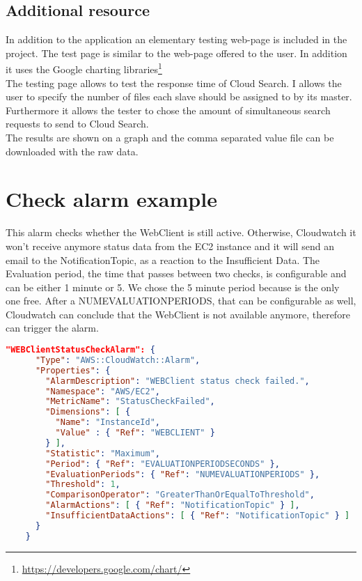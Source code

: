 \documentclass{acm_proc_article-sp}
\begin{document}
\subsection{Additional resource}
In addition to the application an elementary testing web-page is included in the project.
The test page is similar to the web-page offered to the user.
In addition it uses the Google charting libraries\footnote{\url{https://developers.google.com/chart/}}\\
The testing page allows to test the response time of Cloud Search.
I allows the user to specify the number of files each slave should be assigned to by its master.
Furthermore it allows the tester to chose the amount of simultaneous search requests to send to Cloud Search.\\
The results are shown on a graph and the comma separated value file can be downloaded with the raw data.

\section{Check alarm example}
\label{app:exCA}
This alarm checks whether the WebClient is still active. 
Otherwise, Cloudwatch it won't receive anymore status data from the EC2 instance and it will send an email to the NotificationTopic, as a reaction to the Insufficient Data. 
The Evaluation period, the time that passes between two checks, is configurable and can be either 1 minute or 5. 
We chose the 5 minute period because is the only one free. 
After a NUMEVALUATIONPERIODS, that can be configurable as well, Cloudwatch can conclude that the WebClient is not available anymore, therefore can trigger the alarm.

\begin{lstlisting}[language=json,firstnumber=1]
"WEBClientStatusCheckAlarm": {
      "Type": "AWS::CloudWatch::Alarm",
      "Properties": {
        "AlarmDescription": "WEBClient status check failed.",
        "Namespace": "AWS/EC2",
        "MetricName": "StatusCheckFailed",
        "Dimensions": [ {
          "Name": "InstanceId",
          "Value" : { "Ref": "WEBCLIENT" }
        } ],
        "Statistic": "Maximum",
        "Period": { "Ref": "EVALUATIONPERIODSECONDS" },
        "EvaluationPeriods": { "Ref": "NUMEVALUATIONPERIODS" },
        "Threshold": 1,
        "ComparisonOperator": "GreaterThanOrEqualToThreshold",
        "AlarmActions": [ { "Ref": "NotificationTopic" } ],
        "InsufficientDataActions": [ { "Ref": "NotificationTopic" } ]
      }
    }
\end{lstlisting}
\end{document}
